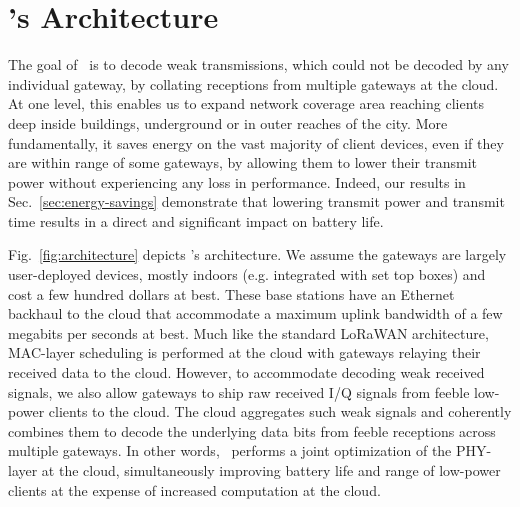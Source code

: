 \section{\name's Architecture}
\label{sec:arch}



The goal of \name\ is to decode weak transmissions, which could not be
decoded by any individual gateway, by collating receptions from multiple
gateways at the cloud. At one level, this  enables us to expand network coverage area reaching clients deep inside buildings, underground or in outer reaches of the city. More fundamentally, it saves energy on the vast majority of client devices, even if they are within range of some gateways, by allowing them to lower their transmit power without experiencing any loss in performance. Indeed, our results in Sec.~\ref{sec:energy-savings} demonstrate that lowering transmit power and transmit time results in a direct and significant impact on battery life. 

Fig.~\ref{fig:architecture} depicts \name's architecture. We assume the gateways are largely user-deployed devices, mostly indoors (e.g. integrated with set top boxes) and cost a few hundred dollars at best. These base stations have an Ethernet backhaul to the cloud that accommodate a maximum uplink bandwidth of a few megabits per seconds at best. Much like the standard LoRaWAN architecture, MAC-layer scheduling is performed at the cloud with gateways relaying their received data to the cloud. However, to accommodate decoding weak received signals, we also allow gateways to ship raw received I/Q signals from feeble low-power clients to the cloud. The cloud aggregates such weak signals and coherently combines them to decode the underlying data bits from feeble receptions across multiple gateways. In other words, \name\ performs a joint optimization of the  PHY-layer at the cloud, simultaneously improving battery life and range of low-power clients at the expense of increased computation at the cloud. 

